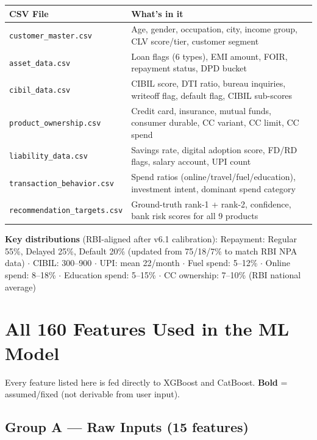 \documentclass[12pt,a4paper]{article}
\begin{document}
\begin{tabular}{p{5cm}p{9cm}}
\toprule
\textbf{CSV File} & \textbf{What's in it} \\
\midrule
\texttt{customer\_master.csv}       & Age, gender, occupation, city, income group, CLV score/tier, customer segment \\
\texttt{asset\_data.csv}            & Loan flags (6 types), EMI amount, FOIR, repayment status, DPD bucket \\
\texttt{cibil\_data.csv}            & CIBIL score, DTI ratio, bureau inquiries, writeoff flag, default flag, CIBIL sub-scores \\
\texttt{product\_ownership.csv}     & Credit card, insurance, mutual funds, consumer durable, CC variant, CC limit, CC spend \\
\texttt{liability\_data.csv}        & Savings rate, digital adoption score, FD/RD flags, salary account, UPI count \\
\texttt{transaction\_behavior.csv}  & Spend ratios (online/travel/fuel/education), investment intent, dominant spend category \\
\texttt{recommendation\_targets.csv}& Ground-truth rank-1 + rank-2, confidence, bank risk scores for all 9 products \\
\bottomrule
\end{tabular}

\textbf{Key distributions} (RBI-aligned after v6.1 calibration):
Repayment: Regular 55\%, Delayed 25\%, Default 20\% (updated from 75/18/7\% to match RBI NPA data) $\cdot$
CIBIL: 300--900 $\cdot$ UPI: mean 22/month $\cdot$
Fuel spend: 5--12\% $\cdot$ Online spend: 8--18\% $\cdot$ Education spend: 5--15\% $\cdot$
CC ownership: 7--10\% (RBI national average)

\newpage
\section{All 160 Features Used in the ML Model}

Every feature listed here is fed directly to XGBoost and CatBoost. \textbf{Bold} = assumed/fixed (not derivable from user input).

\subsection{Group A — Raw Inputs (15 features)}
\end{document}
